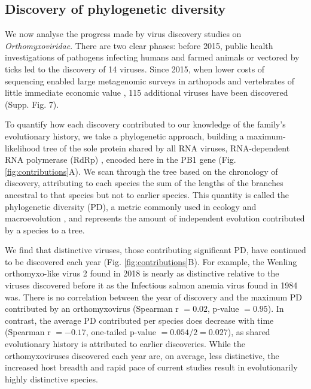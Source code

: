 \documentclass[11pt,twocolumn]{article}
\begin{document}
\begin{figure}
\end{figure}


\subsection{Discovery of phylogenetic diversity}

We now analyse the progress made by virus discovery studies on \textit{Orthomyxoviridae}. There are two clear phases: before 2015, public health investigations of pathogens infecting humans and farmed animals or vectored by ticks led to the discovery of 14 viruses. Since 2015, when lower costs of sequencing enabled large metagenomic surveys in arthopods and vertebrates of little immediate economic value \citep{li_unprecedented_2015, shi_evolutionary_2018}, 115 additional viruses have been discovered (Supp. Fig. 7).

To quantify how each discovery contributed to our knowledge of the family's evolutionary history, we take a phylogenetic approach, building a maximum-likelihood tree of the sole protein shared by all RNA viruses, RNA-dependent RNA polymerase (RdRp) \citep{koonin_virus_2014}, encoded here in the PB1 gene \citep{kobayashi_influenza_1996} (Fig. \ref{fig:contributions}A). We scan through the tree based on the chronology of discovery, attributing to each species the sum of the lengths of the branches ancestral to that species but not to earlier species. This quantity is called the phylogenetic diversity (PD), a metric commonly used in ecology and macroevolution \citep{lum_tracking_2022}, and represents the amount of independent evolution \citep{felsenstein_phylogenies_1985} contributed by a species to a tree.

We find that distinctive viruses, those contributing significant PD, have continued to be discovered each year (Fig. \ref{fig:contributions}B). For example, the Wenling orthomyxo-like virus 2 found in 2018 is nearly as distinctive relative to the viruses discovered before it as the Infectious salmon anemia virus found in 1984 was. There is no correlation between the year of discovery and the maximum PD contributed by an orthomyxovirus (Spearman r $ = 0.02$, p-value $ = 0.95$). In contrast, the average PD contributed per species does decrease with time (Spearman r $ = -0.17$, one-tailed p-value $ = 0.054/2=0.027$), as shared evolutionary history is attributed to earlier discoveries. While the orthomyxoviruses discovered each year are, on average, less distinctive, the increased host breadth and rapid pace of current studies result in evolutionarily highly distinctive species.
\end{document}
